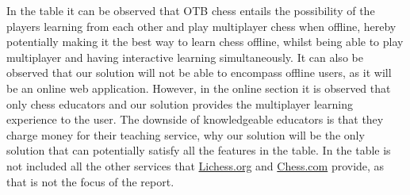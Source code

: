 In the table it can be observed that OTB chess entails the possibility of the players learning from each other and play
multiplayer chess when offline, hereby potentially making it the best way to learn chess offline, whilst being able to
play multiplayer and having interactive learning simultaneously.
It can also be observed that our solution will not be able to encompass offline users, as it will be an online web
application.
However, in the online section it is observed that only chess educators and our solution provides the multiplayer
learning experience to the user.
The downside of knowledgeable educators is that they charge money for their teaching service, why our solution will be
the only solution that can potentially satisfy all the features in the table.
In the table is not included all the other services that \url{Lichess.org} and \url{Chess.com} provide, as that is not
the focus of the report.

